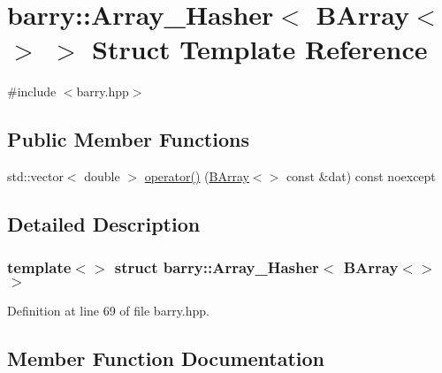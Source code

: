\hypertarget{structbarry_1_1_array___hasher_3_01_b_array_3_4_01_4}{}\section{barry\+:\+:Array\+\_\+\+Hasher$<$ B\+Array$<$$>$ $>$ Struct Template Reference}
\label{structbarry_1_1_array___hasher_3_01_b_array_3_4_01_4}


{\ttfamily \#include $<$barry.\+hpp$>$}

\subsection*{Public Member Functions}
\begin{DoxyCompactItemize}
\item 
std\+::vector$<$ double $>$ \hyperlink{structbarry_1_1_array___hasher_3_01_b_array_3_4_01_4_a0da1aa0b03834f3c992cabce303cfe48}{operator()} (\hyperlink{classbarry_1_1_b_array}{B\+Array}$<$$>$ const \&dat) const noexcept
\end{DoxyCompactItemize}


\subsection{Detailed Description}
\subsubsection*{template$<$$>$\newline
struct barry\+::\+Array\+\_\+\+Hasher$<$ B\+Array$<$$>$ $>$}



Definition at line 69 of file barry.\+hpp.



\subsection{Member Function Documentation}
\mbox{\label{structbarry_1_1_array___hasher_3_01_b_array_3_4_01_4_a0da1aa0b03834f3c992cabce303cfe48}} 

